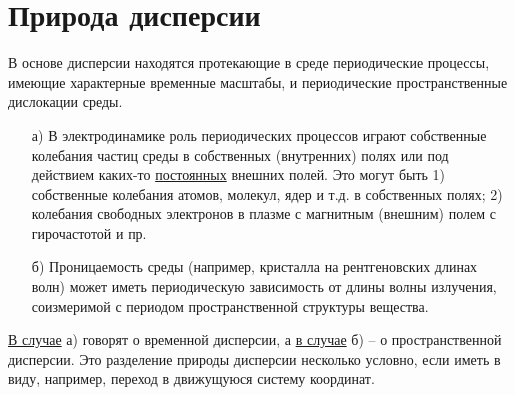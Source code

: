 \documentclass[a4paper]{article}
\begin{document}
\section*{Природа дисперсии}
В основе дисперсии находятся протекающие в среде периодические процессы, имеющие характерные временные масштабы, и периодические пространственные дислокации среды. 
\begin{itemize}
	\item[а)] В электродинамике роль периодических процессов играют собственные колебания частиц среды в собственных (внутренних) полях или под действием каких-то \underline{постоянных} внешних полей. Это могут быть 1) собственные колебания атомов, молекул, ядер и т.д. в собственных полях; 2) колебания свободных электронов в плазме с магнитным (внешним) полем с гирочастотой и пр. 
	\item[б)] Проницаемость среды (например, кристалла на рентгеновских длинах волн) может иметь периодическую зависимость от длины волны излучения, соизмеримой с периодом пространственной структуры вещества. 
\end{itemize}
	
	\underline{В случае} а) говорят о временной дисперсии, а \underline{в случае} б) – о пространственной дисперсии. Это разделение природы дисперсии несколько условно, если иметь в виду, например, переход в движущуюся систему координат. 
	
\end{document}
